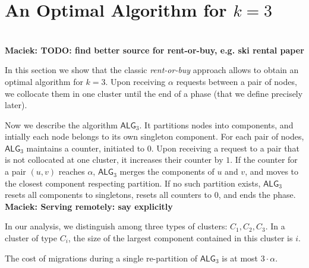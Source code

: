 \documentclass[manuscript,screen=true]{acmart}
\newcommand{\TAlg}{{\ensuremath{\textsf{ALG}_{3}}}\xspace} %
\newcommand\maciek[1]{\color{brown}\textbf{\\ Maciek: #1}\color{black}}
\begin{document}
\section{An Optimal Algorithm for $k=3$}
\label{sec:k3}

\maciek{TODO: find better source for rent-or-buy, e.g. ski rental paper}

In this section we show that the classic \emph{rent-or-buy} approach\cite{borodin-book} allows to obtain an optimal algorithm for $k=3$.
Upon receiving $\alpha$ requests between a pair of nodes, we collocate them in one cluster until the end of a phase (that we define precisely later).



Now we describe the algorithm \TAlg.
It partitions nodes into components, and
intially each node belongs to its own singleton component.
For each pair of nodes, \TAlg maintains a counter, initiated to $0$. 
Upon receiving a request to a pair that is not collocated at one cluster, it increases their counter by $1$.
If the counter for a pair $(u,v)$ reaches $\alpha$, \TAlg merges the components of $u$ and $v$, and moves to the closest component respecting partition.
If no such partition exists, \TAlg resets all components to singletons, resets all counters to $0$, and ends the phase.
\maciek{Serving remotely: say explicitly}




In our analysis, we distinguish among three types of clusters: $C_1, C_2, C_3$. In a cluster of type $C_i$, the size of the largest component contained in this cluster is $i$.

\begin{lemma}
  \label{lem:1req}
  The cost of migrations during a single re-partition of \TAlg is at most $3\cdot\alpha$.
\end{lemma}
\end{document}
